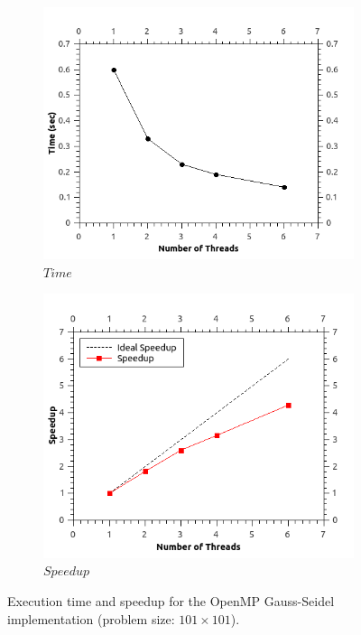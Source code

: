 \documentclass[11pt]{report}
\begin{document}
\begin{figure}[th!]
\centering
\begin{subfigure}{0.45\textwidth}
  \centering
  \includegraphics[width=1.0\linewidth]{images/gauss_time_101}
  \caption{$Time$}
\end{subfigure}
\begin{subfigure}{0.45\textwidth}
  \centering
  \includegraphics[width=1.0\linewidth]{images/gauss_speedup_101}
  \caption{$Speedup$}
\end{subfigure}
\caption{Execution time and speedup for the OpenMP Gauss-Seidel implementation (problem size: $101 \times 101$). }
\label{fig:example5.5}
\end{figure}
\end{document}
